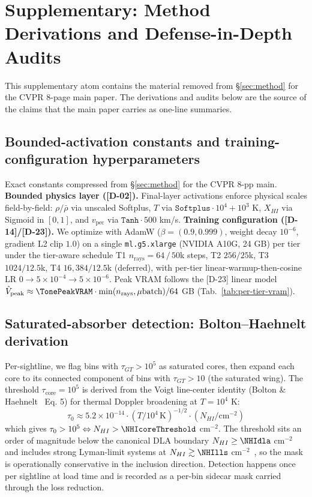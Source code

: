 \section{Supplementary: Method Derivations and Defense-in-Depth Audits}
\label{sec:suppl:method}

This supplementary atom contains the material removed from \S\ref{sec:method} for the CVPR 8-page main paper. The derivations and audits below are the source of the claims that the main paper carries as one-line summaries.

\subsection{Bounded-activation constants and training-configuration hyperparameters}
\label{sec:suppl:method:constants}
Exact constants compressed from \S\ref{sec:method} for the CVPR 8-pp main. \textbf{Bounded physics layer ([D-02]).} Final-layer activations enforce physical scales field-by-field: $\rho/\bar\rho$ via unscaled Softplus, $T$ via $\texttt{Softplus}\cdot 10^4 + 10^3$ K, $X_{HI}$ via Sigmoid in $[0,1]$, and $v_{\text{pec}}$ via $\texttt{Tanh}\cdot 500$ km/s. \textbf{Training configuration ([D-14]/[D-23]).} We optimize with AdamW ($\beta=(0.9,0.999)$, weight decay $10^{-6}$, gradient L2 clip $1.0$) on a single \texttt{ml.g5.xlarge} (NVIDIA A10G, 24 GB) per tier under the tier-aware schedule T1 $n_{\text{rays}}{=}64\,/\,50$k steps, T2 $256/25$k, T3 $1024/12.5$k, T4 $16{,}384/12.5$k (deferred), with per-tier linear-warmup-then-cosine LR $0\!\to\!5\!\times\!10^{-4}\!\to\!5\!\times\!10^{-6}$. Peak VRAM follows the [D-23] linear model $\hat{V}_{\text{peak}}\approx\TonePeakVRAM\cdot\min(n_{\text{rays}},\mu\text{batch})/64$ GB (Tab.~\ref{tab:per-tier-vram}).

\subsection{Saturated-absorber detection: Bolton--Haehnelt derivation}
\label{sec:suppl:method:bh}
Per-sightline, we flag bins with $\tau_{GT} > 10^5$ as saturated cores, then expand each core to its connected component of bins with $\tau_{GT} > 10$ (the saturated wing). The threshold $\tau_{\text{core}} = 10^5$ is derived from the Voigt line-center identity (Bolton \& Haehnelt~\cite{bolton_haehnelt2007} Eq. 5) for thermal Doppler broadening at $T = 10^4$ K:
\begin{equation}
\tau_0 \approx 5.2 \times 10^{-14} \cdot (T/10^4\,\text{K})^{-1/2} \cdot (N_{HI}/\text{cm}^{-2})
\end{equation}
which gives $\tau_0 > 10^5 \Leftrightarrow N_{HI} > \NHIcoreThreshold$ cm$^{-2}$. The threshold sits an order of magnitude below the canonical DLA boundary $N_{HI} \geq \NHIdla$ cm$^{-2}$~\cite{wolfe2005} and includes strong Lyman-limit systems at $N_{HI} \gtrsim \NHIlls$ cm$^{-2}$~\cite{prochaska2010}, so the mask is operationally conservative in the inclusion direction. Detection happens once per sightline at load time and is recorded as a per-bin sidecar mask carried through the loss reduction.

